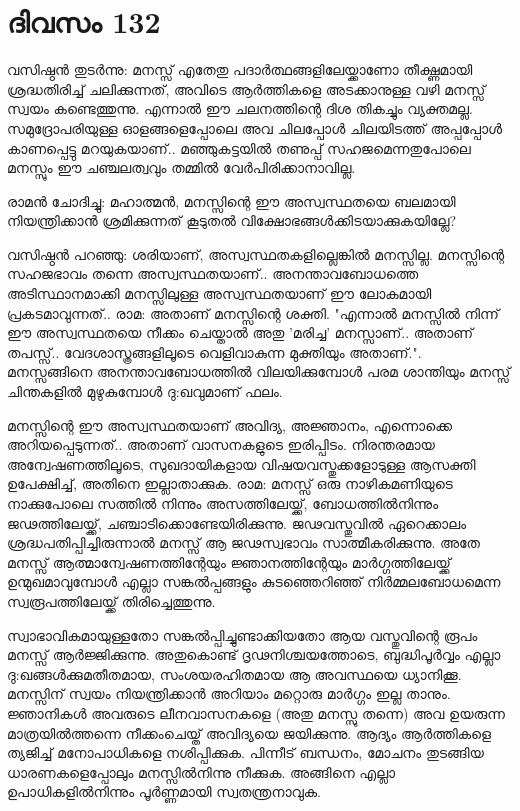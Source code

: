 \newpage
\section{ദിവസം 132}


വസിഷ്ഠന്‍ തുടര്‍ന്നു: മനസ്സ്‌ എതേതു പദാര്‍ത്ഥങ്ങളിലേയ്ക്കാണോ തീക്ഷ്ണമായി ശ്രദ്ധതിരിച്ച് ചലിക്കുന്നത്‌, അവിടെ ആര്‍ത്തികളെ അടക്കാനുള്ള വഴി മനസ്സ്‌ സ്വയം കണ്ടെത്തുന്നു. എന്നാല്‍  ഈ ചലനത്തിന്റെ ദിശ തികച്ചും വ്യക്തമല്ല. സമുദ്രോപരിയുള്ള ഓളങ്ങളെപ്പോലെ അവ ചിലപ്പോള്‍ ചിലയിടത്ത്‌ അപ്പപ്പോള്‍ കാണപ്പെട്ടു മറയുകയാണ്‌.. മഞ്ഞുകട്ടയില്‍ തണുപ്പ്‌ സഹജമെന്നതുപോലെ മനസ്സും ഈ ചഞ്ചലത്വവും  തമ്മില്‍ വേര്‍പിരിക്കാനാവില്ല.

രാമന്‍ ചോദിച്ചു: മഹാത്മന്‍, മനസ്സിന്റെ ഈ അസ്വസ്ഥതയെ ബലമായി നിയന്ത്രിക്കാന്‍ ശ്രമിക്കുന്നത്‌ കൂടുതല്‍ വിക്ഷോഭങ്ങള്‍ക്കിടയാക്കുകയില്ലേ?

വസിഷ്ഠന്‍ പറഞ്ഞു: ശരിയാണ്‌, അസ്വസ്ഥതകളില്ലെങ്കില്‍ മനസ്സില്ല. മനസ്സിന്റെ സഹജഭാവം തന്നെ അസ്വസ്ഥതയാണ്‌.. അനന്താവബോധത്തെ അടിസ്ഥാനമാക്കി മനസ്സിലുള്ള അസ്വസ്ഥതയാണ്‌ ഈ ലോകമായി പ്രകടമാവുന്നത്‌.. രാമ: അതാണ്‌ മനസ്സിന്റെ ശക്തി. "എന്നാല്‍ മനസ്സില്‍ നിന്ന് ഈ അസ്വസ്ഥതയെ നീക്കം ചെയ്താല്‍ അതു 'മരിച്ച' മനസ്സാണ്‌.. അതാണ്‌ തപസ്സ്‌.. വേദശാസ്ത്രങ്ങളിലൂടെ വെളിവാകുന്ന മുക്തിയും അതാണ്‌.". മനസ്സങ്ങിനെ അനന്താവബോധത്തില്‍ വിലയിക്കുമ്പോള്‍ പരമ ശാന്തിയും മനസ്സ്‌ ചിന്തകളില്‍ മുഴുകുമ്പോള്‍ ദു:ഖവുമാണ്‌ ഫലം.

മനസ്സിന്റെ ഈ അസ്വസ്ഥതയാണ്‌ അവിദ്യ, അജ്ഞാനം, എന്നൊക്കെ അറിയപ്പെടുന്നത്‌.. അതാണ്‌ വാസനകളുടെ ഇരിപ്പിടം. നിരന്തരമായ അന്വേഷണത്തിലൂടെ, സുഖദായികളായ വിഷയവസ്തുക്കളോടുള്ള ആസക്തി ഉപേക്ഷിച്ച്‌, അതിനെ ഇല്ലാതാക്കുക. രാമ: മനസ്സ്‌ ഒരു നാഴികമണിയുടെ നാക്കുപോലെ സത്തില്‍ നിന്നും അസത്തിലേയ്ക്ക്‌, ബോധത്തില്‍നിന്നും ജഢത്തിലേയ്ക്ക്‌, ചഞ്ചാടിക്കൊണ്ടേയിരിക്കുന്നു. ജഢവസ്തുവില്‍ ഏറെക്കാലം ശ്രദ്ധപതിപ്പിച്ചിരുന്നാല്‍ മനസ്സ്‌ ആ ജഢസ്വഭാവം സാത്മീകരിക്കുന്നു. അതേ മനസ്സ്‌ ആത്മാന്വേഷണത്തിന്റേയും ജ്ഞാനത്തിന്റേയും മാര്‍ഗ്ഗത്തിലേയ്ക്ക്‌ ഉന്മുഖമാവുമ്പോള്‍ എല്ലാ സങ്കല്‍പ്പങ്ങളും കുടഞ്ഞെറിഞ്ഞ്‌ നിര്‍മ്മലബോധമെന്ന സ്വരൂപത്തിലേയ്ക്ക്‌ തിരിച്ചെത്തുന്നു.

സ്വാഭാവികമായുള്ളതോ സങ്കല്‍പ്പിച്ചുണ്ടാക്കിയതോ ആയ വസ്തുവിന്റെ രൂപം മനസ്സ്‌ ആര്‍ജ്ജിക്കുന്നു. അതുകൊണ്ട്‌ ദൃഢനിശ്ചയത്തോടെ, ബുദ്ധിപൂര്‍വ്വം എല്ലാ ദു:ഖങ്ങള്‍ക്കുമതീതമായ, സംശയരഹിതമായ ആ അവസ്ഥയെ ധ്യാനിക്കൂ. മനസ്സിന്‌ സ്വയം നിയന്ത്രിക്കാന്‍ അറിയാം മറ്റൊരു മാര്‍ഗ്ഗം ഇല്ല താനും. ജ്ഞാനികള്‍ അവരുടെ ലീനവാസനകളെ (അതു മനസ്സു തന്നെ) അവ ഉയരുന്ന മാത്രയില്‍ത്തന്നെ നീക്കംചെയ്ത്‌ അവിദ്യയെ ജയിക്കുന്നു. ആദ്യം ആര്‍ത്തികളെ ത്യജിച്ച്‌ മനോപാധികളെ നശിപ്പിക്കുക. പിന്നീട്‌ ബന്ധനം, മോചനം തുടങ്ങിയ ധാരണകളെപ്പോലും മനസ്സില്‍നിന്നു നീക്കുക. അങ്ങിനെ എല്ലാ ഉപാധികളില്‍നിന്നും പൂര്‍ണ്ണമായി സ്വതന്ത്രനാവുക. 

